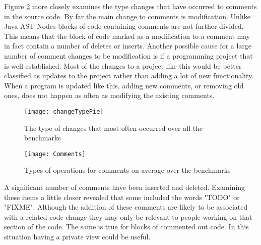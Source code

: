 Figure \ref{fig:commentsPie} more closely examines the type changes that have occurred to comments in the source code.
By far the main change to comments is modification.
Unlike Java AST Nodes blocks of code containing comments are not further divided.
This means that the block of code marked as a modification to a comment may in fact contain a number of deletes or inserts.
Another possible cause for a large number of comment changes to be modification is if a programming project that is well established.
Most of the changes to a project like this would be better classified as updates to the project rather than adding a lot of new functionality.
When a program is updated like this, adding new comments, or removing old ones, does not happen as often as modifying the existing comments.

\begin{figure}[!t] 
 \begin{center}
 \texttt{[image: changeTypePie]}
 \end{center}
 \caption{The type of changes that most often occurred over all the benchmarks}
 \label{fig:changeType}
\end{figure}

\begin{figure}[!t] 
 \begin{center}
 \texttt{[image: Comments]}
 \end{center}
 \caption{Types of operations for comments on average over the benchmarks}
 \label{fig:commentsPie}
\end{figure}

A significant number of comments have been inserted and deleted.
Examining these items a little closer revealed that some included the words "TODO" or "FIXME".
Although the addition of these comments are likely to be associated with a related code change they may only be relevant to people working on that section of the code.
The same is true for blocks of commented out code.
In this situation having a private view could be useful. 





